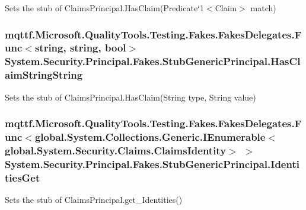 Sets the stub of Claims\-Principal.\-Has\-Claim(Predicate`1$<$Claim$>$ match)

\hypertarget{class_system_1_1_security_1_1_principal_1_1_fakes_1_1_stub_generic_principal_acbe8215662b9d5b35fc52e07841fbbe1}{
\subsubsection[{Has\-Claim\-String\-String}]{\setlength{\rightskip}{0pt plus 5cm}mqttf.\-Microsoft.\-Quality\-Tools.\-Testing.\-Fakes.\-Fakes\-Delegates.\-Func$<$string, string, bool$>$ System.\-Security.\-Principal.\-Fakes.\-Stub\-Generic\-Principal.\-Has\-Claim\-String\-String}}\label{class_system_1_1_security_1_1_principal_1_1_fakes_1_1_stub_generic_principal_acbe8215662b9d5b35fc52e07841fbbe1}


Sets the stub of Claims\-Principal.\-Has\-Claim(\-String type, String value)

\hypertarget{class_system_1_1_security_1_1_principal_1_1_fakes_1_1_stub_generic_principal_afb567fa494044341ff04d24afab54796}{
\subsubsection[{Identities\-Get}]{\setlength{\rightskip}{0pt plus 5cm}mqttf.\-Microsoft.\-Quality\-Tools.\-Testing.\-Fakes.\-Fakes\-Delegates.\-Func$<$global.\-System.\-Collections.\-Generic.\-I\-Enumerable$<$global.\-System.\-Security.\-Claims.\-Claims\-Identity$>$ $>$ System.\-Security.\-Principal.\-Fakes.\-Stub\-Generic\-Principal.\-Identities\-Get}}\label{class_system_1_1_security_1_1_principal_1_1_fakes_1_1_stub_generic_principal_afb567fa494044341ff04d24afab54796}


Sets the stub of Claims\-Principal.\-get\-\_\-\-Identities()

